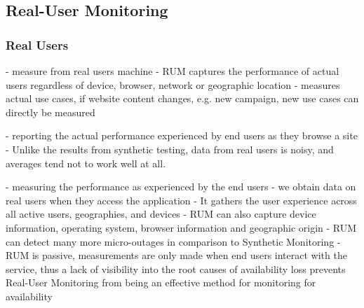 









\subsection{Real-User Monitoring}


\subsubsection{Real Users}

- measure from real users machine
- RUM captures the performance of actual users regardless of device, browser, network or geographic location
- measures actual use cases, if website content changes, e.g. new campaign, new use cases can directly be measured



- reporting the actual performance experienced by end users as they browse a site
- Unlike the results from synthetic testing, data from real users is noisy, and averages tend not to work well at all.



- measuring the performance as experienced by the end users
- we obtain data on real users when they access the application
- It gathers the user experience across all active users, geographies, and devices
- RUM can also capture device information, operating system, browser information and geographic origin
- RUM can detect many more micro-outages in comparison to Synthetic Monitoring
- RUM is passive, measurements are only made when end users interact with the service, thus a lack of visibility into the root causes of availability loss prevents Real-User Monitoring from being an effective method for monitoring for availability



